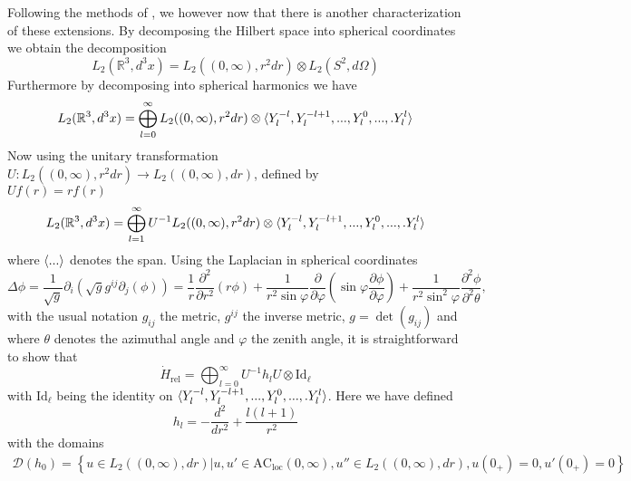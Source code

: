 \documentclass[a4paper,11pt]{article}
\newcommand{\dom}[1]{\mathscr D\left(#1\right)}
\newcommand{\R}{\mathbb{R}}
\begin{document}
Following the methods of \cite{albeverio2012solvable}, we however now that there is another characterization of these extensions. By decomposing the Hilbert space into spherical coordinates we obtain the decomposition \begin{equation}
L_2(\R^3,d^3x)=L_2((0,\infty),r^2dr)\otimes L_2(S^2,d\Omega)
\end{equation}
Furthermore by decomposing into spherical harmonics we have \begin{equation}
L_2(\R^3,d^3x)=\bigoplus_{l=0}^{\infty}L_2((0,\infty),r^2dr)\otimes \braket{Y_l^{-l},Y_l^{-l+1},...,Y_l^0,...,.Y_l^l}
\end{equation}
Now using the unitary transformation $ U:L_2((0,\infty),r^2dr)\to L_2((0,\infty),dr) $, defined by\\ $ Uf(r)=rf(r) $
\begin{equation}
L_2(\R^3,d^3x)=\bigoplus_{l=1}^{\infty}U^{-1}L_2((0,\infty),r^2dr)\otimes \braket{Y_l^{-l},Y_l^{-l+1},...,Y_l^0,...,.Y_l^l}
\end{equation}
where $ \braket{...} $ denotes the span. Using the Laplacian in spherical coordinates \begin{equation}
\Delta\phi=\frac{1}{\sqrt{g}}\partial_i(\sqrt{g}g^{ij}\partial_j(\phi))=\frac{1}{r}\frac{\partial^2}{\partial r^2}(r\phi)+\frac{1}{r^2\sin\varphi}\frac{\partial}{\partial\varphi}(\sin\varphi\frac{\partial\phi}{\partial\varphi})+\frac{1}{r^2\sin^2\varphi}\frac{\partial^2\phi}{\partial^2\theta},
\end{equation} with the usual notation $ g_{ij} $ the metric, $ g^{ij} $ the inverse metric, $ g=\det(g_{ij}) $ and where $ \theta $ denotes the azimuthal angle and $ \varphi $ the zenith angle, it is straightforward to show that\begin{equation}
\dot{H}_{\text{rel}}=\bigoplus_{l=0}^{\infty}U^{-1}h_lU\otimes\text{Id}_{\ell}
\end{equation}
with $ \text{Id}_\ell $ being the identity on $ \braket{Y_l^{-l},Y_l^{-l+1},...,Y_l^0,...,.Y_l^l} $. Here we have defined \begin{equation}
h_l=-\frac{d^2}{dr^2}+\frac{l(l+1)}{r^2}
\end{equation}
with the domains\begin{equation}
\begin{aligned}\dom{h_0}=\left\{u\in L_2((0,\infty),dr)|u,u'\in\text{AC}_{\text{loc}}(0,\infty),u''\in L_2((0,\infty),dr), u(0_+)=0, u'(0_+)=0\right\}
\end{aligned}
\end{equation}
\end{document}
